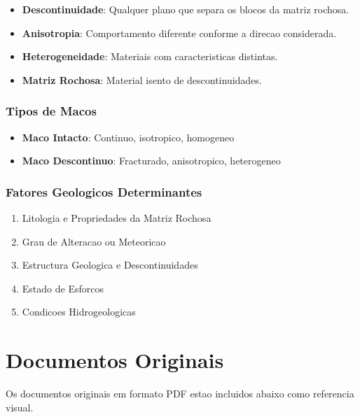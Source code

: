 \documentclass[12pt,a4paper,twoside]{book}
\begin{document}
\begin{itemize}
    \item \textbf{Descontinuidade}: Qualquer plano que separa os blocos da matriz rochosa.
    \item \textbf{Anisotropia}: Comportamento diferente conforme a direcao considerada.
    \item \textbf{Heterogeneidade}: Materiais com caracteristicas distintas.
    \item \textbf{Matriz Rochosa}: Material isento de descontinuidades.
\end{itemize}

\subsection{Tipos de Macos}

\begin{itemize}
    \item \textbf{Maco Intacto}: Continuo, isotropico, homogeneo
    \item \textbf{Maco Descontinuo}: Fracturado, anisotropico, heterogeneo
\end{itemize}

\subsection{Fatores Geologicos Determinantes}

\begin{enumerate}
    \item Litologia e Propriedades da Matriz Rochosa
    \item Grau de Alteracao ou Meteoricao
    \item Estructura Geologica e Descontinuidades
    \item Estado de Esforcos
    \item Condicoes Hidrogeologicas
\end{enumerate}

\newpage

\appendix
\chapter{Documentos Originais}

Os documentos originais em formato PDF estao incluidos abaixo como referencia visual.
\end{document}
